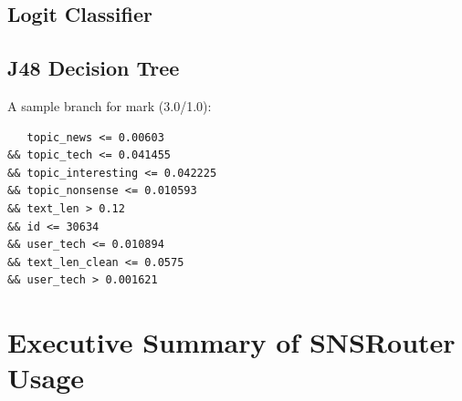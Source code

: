 \documentclass{sig-alternate}
\begin{document}
\subsection{Logit Classifier}
\label{sec:Logit Classifier}

\subsection{J48 Decision Tree}
\label{sec:J48 Decision Tree}

A sample branch for mark (3.0/1.0):

\begin{Verbatim}
   topic_news <= 0.00603 
&& topic_tech <= 0.041455
&& topic_interesting <= 0.042225 
&& topic_nonsense <= 0.010593 
&& text_len > 0.12 
&& id <= 30634 
&& user_tech <= 0.010894 
&& text_len_clean <= 0.0575
&& user_tech > 0.001621
\end{Verbatim}

\section{Executive Summary of SNSRouter Usage}
\label{sec:Executive Summary of SNSRouter Usage}




\end{document}
